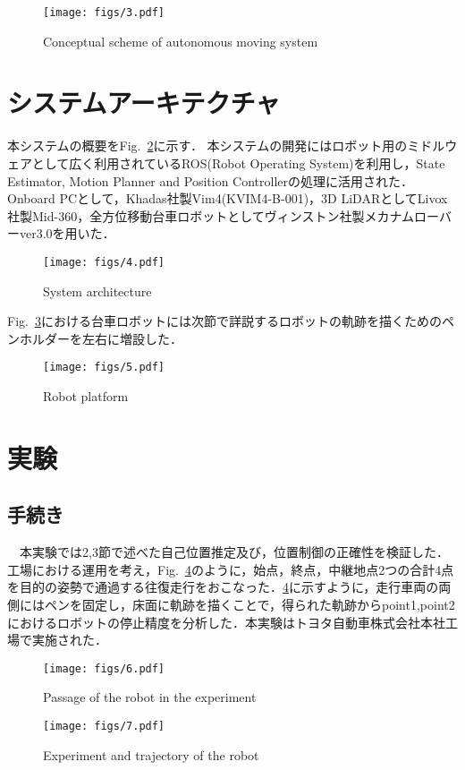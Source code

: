 \begin{figure}[h]
\texttt{[image: figs/3.pdf]}
\caption{Conceptual scheme of autonomous moving system}
\label{fig:fig3}
\end{figure}

\section{システムアーキテクチャ}

本システムの概要をFig.~\ref{fig:fig4}に示す．
本システムの開発にはロボット用のミドルウェアとして広く利用されているROS(Robot Operating System)を利用し，State Estimator, Motion Planner and Position Controllerの処理に活用された．
Onboard PCとして，Khadas社製Vim4(KVIM4-B-001)，3D LiDARとしてLivox社製Mid-360，全方位移動台車ロボットとしてヴィンストン社製メカナムローバーver3.0を用いた．

\begin{figure}[h]
\texttt{[image: figs/4.pdf]}
\caption{System architecture}
\label{fig:fig4}
\end{figure}

Fig.~\ref{fig:fig5}における台車ロボットには次節で詳説するロボットの軌跡を描くためのペンホルダーを左右に増設した．

\begin{figure}[h]
\texttt{[image: figs/5.pdf]}
\caption{Robot platform}
\label{fig:fig5}
\end{figure}

\section{実験}
\subsection{手続き}
　本実験では2,3節で述べた自己位置推定及び，位置制御の正確性を検証した．工場における運用を考え，Fig.~\ref{fig:fig6}のように，始点，終点，中継地点2つの合計4点を目的の姿勢で通過する往復走行をおこなった．\ref{fig:fig6}に示すように，走行車両の両側にはペンを固定し，床面に軌跡を描くことで，得られた軌跡からpoint1,point2におけるロボットの停止精度を分析した．本実験はトヨタ自動車株式会社本社工場で実施された．

\begin{figure}[h]
\texttt{[image: figs/6.pdf]}
\caption{Passage of the robot in the experiment}
\label{fig:fig6}
\end{figure}
\begin{figure}[h]
\texttt{[image: figs/7.pdf]}
\caption{Experiment and trajectory of the robot}
\label{fig:fig7}
\end{figure}


